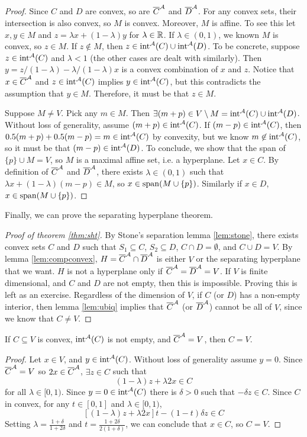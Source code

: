 \begin{proof}
  Since $C$ and $D$ are convex, so are ${\overline{{C}}}^\mathcal{A}$ and
  ${\overline{{D}}}^\mathcal{A}$. For any convex sets, their intersection is also
  convex, so $M$ is convex. Moreover, $M$ is affine. To see this let
  $x,y \in M$ and $z = \lambda x + (1-\lambda) y $ for $\lambda \in
  \mathbb{R}$. If $\lambda \in (0,1)$, we known $M$ is convex, so $z \in
  M$. If $z \not\in M$, then $z \in {\mathrm{int}}^{\mathcal{A}}({C}) \cup
  {\mathrm{int}}^{\mathcal{A}}({D})$. To be concrete, suppose $z \in {\mathrm{int}}^{\mathcal{A}}({C})$ and $\lambda<1$
  (the other cases are dealt with similarly). Then $y = z/(1-\lambda)
  - \lambda/(1-\lambda) x$ is a convex combination of $x$ and
  $z$. Notice that $x \in {\overline{{C}}}^\mathcal{A}$ and $z \in {\mathrm{int}}^{\mathcal{A}}({C})$ implies
  $y \in {\mathrm{int}}^{\mathcal{A}}({C})$, but this contradicts the assumption that $y
  \in M$. Therefore, it must be that $z \in M$. 

  Suppose $M \neq V$. Pick any $m \in M$. Then
  $\exists (m+p) \in V \setminus M = {\mathrm{int}}^{\mathcal{A}}({C}) \cup
  {\mathrm{int}}^{\mathcal{A}}({D})$.
  Without loss of generality, assume $(m+p) \in {\mathrm{int}}^{\mathcal{A}}({C})$.  If
  $(m-p) \in {\mathrm{int}}^{\mathcal{A}}({C})$, then
  $0.5(m+p) + 0.5(m-p) = m \in {\mathrm{int}}^{\mathcal{A}}({C})$ by convexity, but we
  know $m \not\in {\mathrm{int}}^{\mathcal{A}}({C})$, so it must be that
  $(m-p) \in {\mathrm{int}}^{\mathcal{A}}({D})$. To conclude, we show that the span of
  $\{p\} \cup M = V$, so $M$ is a maximal affine set, i.e. a
  hyperplane. Let $x \in C$. By definition of ${\overline{{C}}}^\mathcal{A}$ and
  ${\overline{{D}}}^\mathcal{A}$, there exists $\lambda \in (0,1)$ such that
  $\lambda x + (1-\lambda) (m-p) \in M$, so
  $x \in \mathrm{span}(M \cup \{p\})$. Similarly if $x \in D$,
  $x \in \mathrm{span}(M \cup \{p\})$.
\end{proof}
Finally, we can prove the separating hyperplane theorem.
\begin{proof}[Proof of theorem \ref{thm:sht}]
  By Stone's separation lemma \ref{lem:stone}, there exists convex
  sets $C$ and $D$ such that $S_1 \subseteq C$, $S_2 \subseteq D$,
  $C \cap D = \emptyset$, and $C \cup D = V$. By lemma
  \ref{lem:compconvex}, $H = {\overline{{C}}}^\mathcal{A} \cap {\overline{{D}}}^\mathcal{A}$ is either
  $V$ or the separating hyperplane that we want. $H$ is not a
  hyperplane only if ${\overline{{C}}}^\mathcal{A} = {\overline{{D}}}^\mathcal{A} = V$. If $V$ is
  finite dimensional, and $C$ and $D$ are not empty, then this is
  impossible. Proving this is left as an exercise. Regardless of the
  dimension of $V$, if $C$ (or $D$) has a non-empty interior, then
  lemma \ref{lem:ubiq} implies that ${\overline{{C}}}^\mathcal{A}$ (or ${\overline{{D}}}^\mathcal{A}$)
  cannot be all of $V$, since we know that $C \neq V$.
\end{proof}
\begin{lemma}\label{lem:ubiq}
  If $C \subseteq V$ is convex, ${\mathrm{int}}^{\mathcal{A}}({C})$ is not empty, and
  ${\overline{{C}}}^\mathcal{A} = V$, then $C = V$. 
\end{lemma}
\begin{proof}
  Let $x \in V$, and $y \in {\mathrm{int}}^{\mathcal{A}}({C})$.  Without loss of
  generality assume $y = 0$. Since ${\overline{{C}}}^\mathcal{A} = V$ so $2x \in {\overline{{C}}}^\mathcal{A}$,
  $\exists z \in C$ such that
  \[ (1-\lambda)z + \lambda 2x \in C \]
  for all $\lambda \in [0,1)$. 
  Since $y = 0 \in {\mathrm{int}}^{\mathcal{A}}({C})$ there is $\delta>0$ such that 
  $-\delta z \in C$. Since $C$ in convex, for any $t \in [0,1]$ and
  $\lambda \in [0,1)$,
  \[ [(1-\lambda)z + \lambda 2x] t - (1-t) \delta z \in C \]
  Setting $\lambda = \frac{1+\delta}{1+2\delta}$ and $t =
  \frac{1+2\delta}{2(1+\delta)}$, we can conclude that $x \in C$, so
  $C = V$.  
\end{proof}

